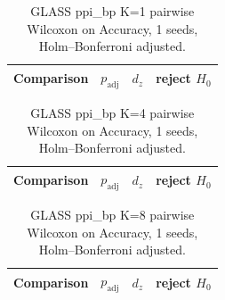 \begin{table}[t]
\centering
\small
\caption{GLASS ppi\_bp K=1 pairwise Wilcoxon on Accuracy, 1 seeds, Holm--Bonferroni adjusted.}
\label{tab:glass_ppi_bp_K1_pw}
\begin{tabular}{lrrc}
\toprule
Comparison & $p_{\mathrm{adj}}$ & $d_z$ & reject $H_0$ \\
\midrule
\bottomrule
\end{tabular}
\end{table}

\begin{table}[t]
\centering
\small
\caption{GLASS ppi\_bp K=4 pairwise Wilcoxon on Accuracy, 1 seeds, Holm--Bonferroni adjusted.}
\label{tab:glass_ppi_bp_K4_pw}
\begin{tabular}{lrrc}
\toprule
Comparison & $p_{\mathrm{adj}}$ & $d_z$ & reject $H_0$ \\
\midrule
\bottomrule
\end{tabular}
\end{table}

\begin{table}[t]
\centering
\small
\caption{GLASS ppi\_bp K=8 pairwise Wilcoxon on Accuracy, 1 seeds, Holm--Bonferroni adjusted.}
\label{tab:glass_ppi_bp_K8_pw}
\begin{tabular}{lrrc}
\toprule
Comparison & $p_{\mathrm{adj}}$ & $d_z$ & reject $H_0$ \\
\midrule
\bottomrule
\end{tabular}
\end{table}

